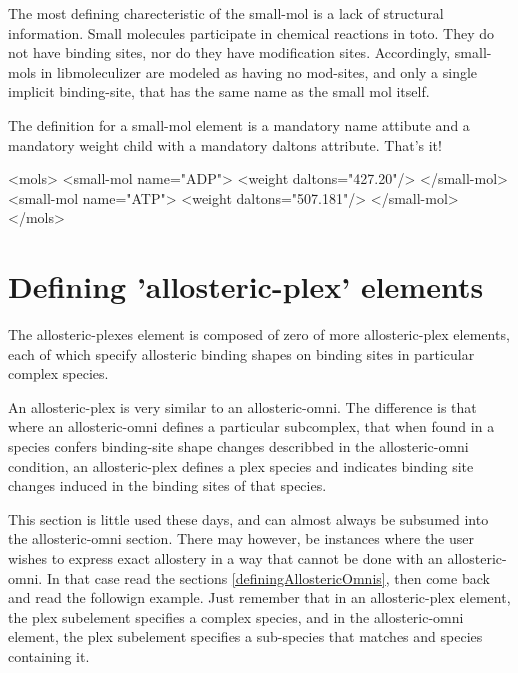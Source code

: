 The most defining charecteristic of the small-mol is a lack of
structural information.  Small molecules participate in chemical
reactions in toto.  They do not have binding sites, nor do they have
modification sites.  Accordingly, small-mols in libmoleculizer are
modeled as having no mod-sites, and only a single implicit
binding-site, that has the same name as the small mol itself. 

The definition for a small-mol element is a mandatory name attibute
and a mandatory weight child with a mandatory daltons attribute.
That's it!

\begin{ExampleXML}[caption=Examples of small-mol definitions, label=smallmolex]
<mols>
  <small-mol name="ADP">
    <weight daltons="427.20"/>
  </small-mol>
  <small-mol name="ATP">
    <weight daltons="507.181"/>
  </small-mol>
</mols>
\end{ExampleXML}

\section{Defining 'allosteric-plex' elements}

The allosteric-plexes element is composed of zero of more
allosteric-plex elements, each of which specify allosteric binding
shapes on binding sites in particular complex species.

An allosteric-plex is very similar to an allosteric-omni.  The
difference is that where an allosteric-omni defines a particular
subcomplex, that when found in a species confers binding-site shape
changes describbed in the allosteric-omni condition, an
allosteric-plex defines a plex species and indicates binding site
changes induced in the binding sites of that species.  

This section is little used these days, and can almost always be
subsumed into the allosteric-omni section.  There may however, be
instances where the user wishes to express exact allostery in a way
that cannot be done with an allosteric-omni.  In that case read the
sections \ref{definingAllostericOmnis}, then come back and read the
followign example.  Just remember that in an allosteric-plex element,
the plex subelement specifies a complex species, and in the
allosteric-omni element, the plex subelement specifies a sub-species
that matches and species containing it.  


